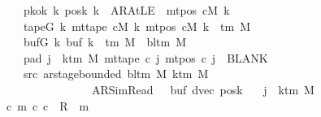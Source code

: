 \begin{isabellebody}
\ \ \ \ \ \ \ pkok{\isacharcolon}{\kern0pt}\ {\isachardoublequoteopen}{\isasymAnd}k{\isachardot}{\kern0pt}\ posk{}\ k\ {\isacharequal}{\kern0pt}\ AR{\isacharunderscore}{\kern0pt}AtLE\ {\isasymlongleftrightarrow}\ mt{\isacharunderscore}{\kern0pt}pos\ cM\ k\ {\isacharequal}{\kern0pt}\ {}{\isachardoublequoteclose}\isanewline
\ \ \ \ \ \ \ tapeG{\isacharcolon}{\kern0pt}\ {\isachardoublequoteopen}{\isasymAnd}k{\isachardot}{\kern0pt}\ mt{\isacharunderscore}{\kern0pt}tape\ cM\ k\ {\isacharparenleft}{\kern0pt}mt{\isacharunderscore}{\kern0pt}pos\ cM\ k{\isacharparenright}{\kern0pt}\ {\isasymin}\ {\isasymGamma}{\isacharunderscore}{\kern0pt}tm\ M{\isachardoublequoteclose}\isanewline
\ \ \ \ \ \ \ bufG{\isacharcolon}{\kern0pt}\ {\isachardoublequoteopen}{\isasymAnd}k{\isachardot}{\kern0pt}\ buf{}\ k\ {\isasymin}\ {\isasymGamma}{\isacharunderscore}{\kern0pt}tm\ M\ {\isasymunion}\ {\isacharbraceleft}{\kern0pt}bl{\isacharunderscore}{\kern0pt}tm\ M{\isacharbraceright}{\kern0pt}{\isachardoublequoteclose}\isanewline
\ \ \ \ \ \ \ pad{}{\isacharcolon}{\kern0pt}\ {\isachardoublequoteopen}{\isasymforall}j\ {\isasymge}\ k{\isacharunderscore}{\kern0pt}tm\ M{\isachardot}{\kern0pt}\ mt{\isacharunderscore}{\kern0pt}tape\ c{}\ j\ {\isacharparenleft}{\kern0pt}mt{\isacharunderscore}{\kern0pt}pos\ c{}\ j{\isacharparenright}{\kern0pt}\ {\isacharequal}{\kern0pt}\ BLANK{}{\isachardoublequoteclose}\isanewline
\ \ \ \ \ \ \ src{}{\isacharcolon}{\kern0pt}\ {\isachardoublequoteopen}ar{\isacharunderscore}{\kern0pt}stage{\isacharunderscore}{\kern0pt}bounded\ {\isacharparenleft}{\kern0pt}bl{\isacharunderscore}{\kern0pt}tm\ M{\isacharparenright}{\kern0pt}\ {\isacharparenleft}{\kern0pt}k{\isacharunderscore}{\kern0pt}tm\ M{\isacharparenright}{\kern0pt}\isanewline
\ \ \ \ \ \ \ \ \ \ \ \ \ \ \ \ \ \ \ {\isacharparenleft}{\kern0pt}AR{\isacharunderscore}{\kern0pt}SimRead{\isacharcomma}{\kern0pt}\ {}{\isacharcomma}{\kern0pt}\ {}{\isacharcomma}{\kern0pt}\ buf{}{\isacharcomma}{\kern0pt}\ dvec{\isacharcomma}{\kern0pt}\ posk{}{\isacharparenright}{\kern0pt}{\isachardoublequoteclose}\isanewline
\ \ \ {\isachardoublequoteopen}j\ {\isasymle}\ k{\isacharunderscore}{\kern0pt}tm\ M\ {\isacharminus}{\kern0pt}\ {}\ {\isasymLongrightarrow}\isanewline
\ \ \ \ {\isacharparenleft}{\kern0pt}{\isasymexists}c\ m{\isachardot}{\kern0pt}\ {\isacharparenleft}{\kern0pt}c{}{\isacharcomma}{\kern0pt}\ c{\isacharparenright}{\kern0pt}\ {\isasymin}\ R{\isacharprime}{\kern0pt}\ {\isacharcircum}{\kern0pt}{\isacharcircum}{\kern0pt}\ m\isanewline

\end{isabellebody}
